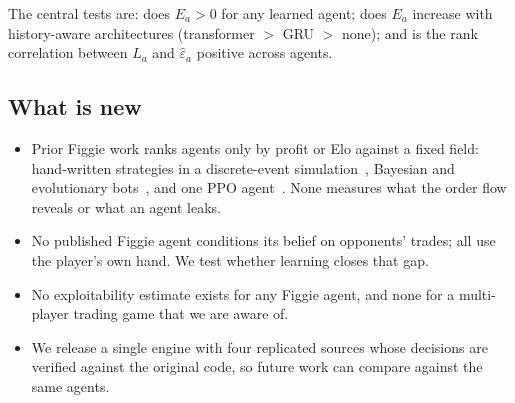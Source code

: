 \documentclass{article}
\begin{document}
The central tests are: does $E_a>0$ for any learned agent; does $E_a$ increase with history-aware architectures (transformer $>$ GRU $>$ none); and is the rank correlation between $L_a$ and $\hat\varepsilon_a$ positive across agents.



\subsection{What is new}
\begin{itemize}[leftmargin=*,itemsep=2pt]
  \item Prior Figgie work ranks agents only by profit or Elo against a fixed field: hand-written strategies in a discrete-event simulation~\cite{strange}, Bayesian and evolutionary bots~\cite{figment,figgiebot}, and one PPO agent~\cite{cs224r}. None measures what the order flow reveals or what an agent leaks.
  \item No published Figgie agent conditions its belief on opponents' trades; all use the player's own hand. We test whether learning closes that gap.
  \item No exploitability estimate exists for any Figgie agent, and none for a multi-player trading game that we are aware of.
  \item We release a single engine with four replicated sources whose decisions are verified against the original code, so future work can compare against the same agents.
\end{itemize}
\end{document}
